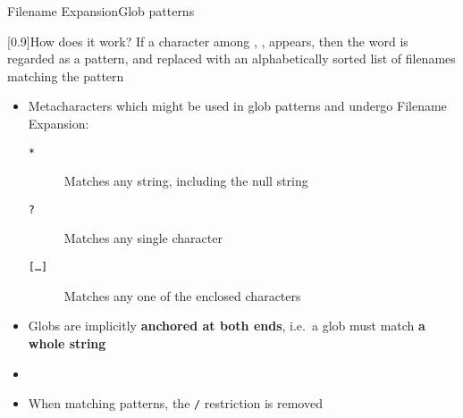 \begin{frame}{Filename Expansion}{Glob patterns}
    \vspace{-3mm}
    \begin{varblock}{}[0.9\textwidth]{How does it work?}
        If a character among \PB{\texttt{*}}, , \PB{\texttt{[}} appears, then the word is regarded as a pattern, and replaced with an alphabetically sorted list of filenames matching the pattern
    \end{varblock}
    \begin{itemize}
        \item Metacharacters which might be used in glob patterns and undergo Filename Expansion:
              \begin{description}
                  \item[\texttt{*}]
                      Matches any string, including the null string
                  \item[\texttt{?}]
                      Matches any single character
                  \item[\texttt{[\ldots]}]
                      Matches any one of the enclosed characters
              \end{description}
        \item Globs are implicitly \textbf{anchored at both ends}, i.e.\ \alert{a glob must match \textbf{a whole string}}
        \item {}
        \item When matching patterns, the \texttt{/} restriction is removed
    \end{itemize}
\end{frame}
